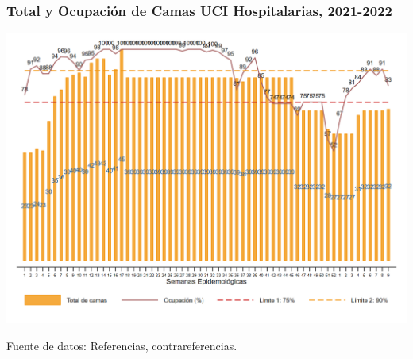 \documentclass[xcolor=table]{beamer}
\begin{document}
	\begin{frame}[label=camas]
		\frametitle{Total y Ocupación de Camas UCI Hospitalarias, 2021-2022}
		\vspace{-.2cm}
		\begin{center}
			\includegraphics[width=0.9\linewidth, trim={0cm .5cm 0cm 0.2cm},clip]{../figuras/uci.png}		
		\begin{table}[]
			\vspace{-.5cm}
		\end{table}
		\end{center}
		{\tiny Fuente de datos: Referencias, contrareferencias.}
	\end{frame}
	
\end{document}
